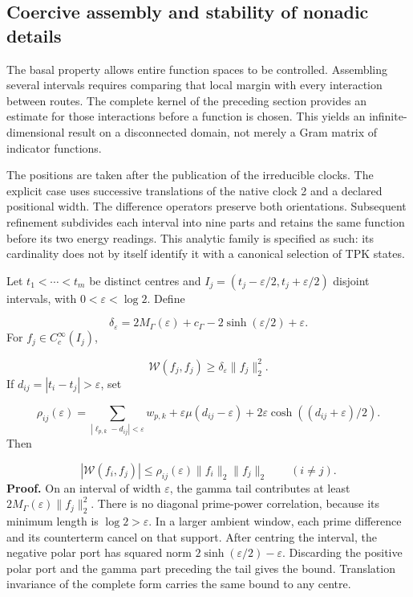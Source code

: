 \subsection{Coercive assembly and stability of nonadic details}
\label{viii:rz:ensamblaje}
The basal property allows entire function spaces to be controlled. Assembling several intervals requires comparing that local margin with every interaction between routes. The complete kernel of the preceding section provides an estimate for those interactions before a function is chosen. This yields an infinite-dimensional result on a disconnected domain, not merely a Gram matrix of indicator functions.

The positions are taken after the publication of the irreducible clocks. The explicit case uses successive translations of the native clock 2 and a declared positional width. The difference operators preserve both orientations. Subsequent refinement subdivides each interval into nine parts and retains the same function before its two energy readings. This analytic family is specified as such: its cardinality does not by itself identify it with a canonical selection of TPK states.

Let \(t_1<\cdots<t_m\) be distinct centres and \(I_j=(t_j-\varepsilon/2,t_j+\varepsilon/2)\) disjoint intervals, with \(0<\varepsilon<\log2\). Define

\[
\delta_\varepsilon=2M_\Gamma(\varepsilon)+c_\Gamma
-2\sinh(\varepsilon/2)+\varepsilon.
\]
For \(f_j\in C_c^\infty(I_j)\),

\[
\mathscr W(f_j,f_j)\geq\delta_\varepsilon\|f_j\|_2^2.
\]
If \(d_{ij}=|t_i-t_j|>\varepsilon\), set

\[
\rho_{ij}(\varepsilon)=
\sum_{|\ell_{p,k}-d_{ij}|<\varepsilon}w_{p,k}
+\varepsilon\mu(d_{ij}-\varepsilon)
+2\varepsilon\cosh((d_{ij}+\varepsilon)/2).
\]
Then

\[
|\mathscr W(f_i,f_j)|
\leq\rho_{ij}(\varepsilon)\|f_i\|_2\|f_j\|_2
\qquad(i\neq j).
\]
\textbf{Proof.} On an interval of width \(\varepsilon\), the gamma tail contributes at least \(2M_\Gamma(\varepsilon)\|f_j\|_2^2\). There is no diagonal prime-power correlation, because its minimum length is \(\log2>\varepsilon\). In a larger ambient window, each prime difference and its counterterm cancel on that support. After centring the interval, the negative polar port has squared norm \(2\sinh(\varepsilon/2)-\varepsilon\). Discarding the positive polar port and the gamma part preceding the tail gives the bound. Translation invariance of the complete form carries the same bound to any centre.

